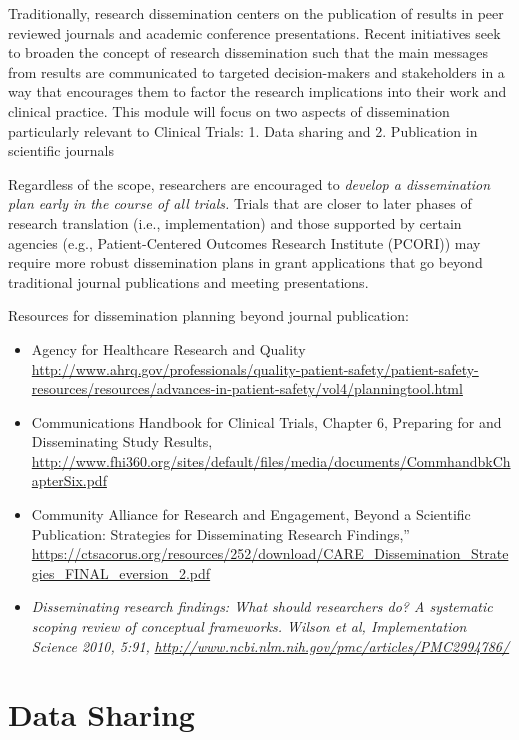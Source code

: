 \documentclass[]{book}
\begin{document}
Traditionally, research dissemination centers on the publication of
results in peer reviewed journals and academic conference presentations.
Recent initiatives seek to broaden the concept of research dissemination
such that the main messages from results are communicated to targeted
decision-makers and stakeholders in a way that encourages them to factor
the research implications into their work and clinical practice. This
module will focus on two aspects of dissemination particularly relevant
to Clinical Trials: 1. Data sharing and 2. Publication in scientific
journals

Regardless of the scope, researchers are encouraged to \emph{develop a
dissemination plan early in the course of all trials.} Trials that are
closer to later phases of research translation (i.e., implementation)
and those supported by certain agencies (e.g., Patient-Centered Outcomes
Research Institute (PCORI)) may require more robust dissemination plans
in grant applications that go beyond traditional journal publications
and meeting presentations.

Resources for dissemination planning beyond journal publication:

\begin{itemize}
\item
  Agency for Healthcare Research and Quality
  \url{http://www.ahrq.gov/professionals/quality-patient-safety/patient-safety-resources/resources/advances-in-patient-safety/vol4/planningtool.html}
\item
  Communications Handbook for Clinical Trials, Chapter 6, Preparing for
  and Disseminating Study Results,
  \url{http://www.fhi360.org/sites/default/files/media/documents/CommhandbkChapterSix.pdf}
\item
  Community Alliance for Research and Engagement, Beyond a Scientific
  Publication: Strategies for Disseminating Research Findings,''
  \url{https://ctsacorus.org/resources/252/download/CARE_Dissemination_Strategies_FINAL_eversion_2.pdf}
\item
  \emph{Disseminating research findings: What should researchers do? A
  systematic scoping review of conceptual frameworks. Wilson et al,
  Implementation Science 2010, 5:91,}
  \href{http://www.ncbi.nlm.nih.gov/pmc/articles/PMC2994786/}{\emph{http://www.ncbi.nlm.nih.gov/pmc/articles/PMC2994786/}}
\end{itemize}

\section{Data Sharing}\label{data-sharing}
\end{document}
